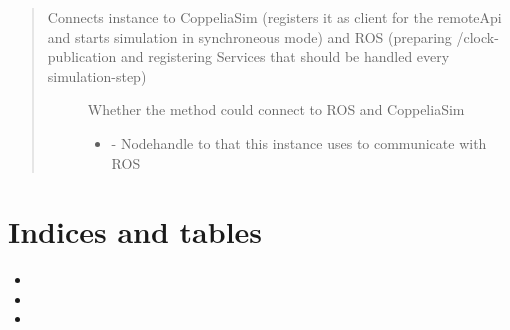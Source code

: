 \documentclass[letterpaper,10pt,english]{sphinxmanual}
\begin{document}
\begin{quote}
\begin{fulllineitems}
\begin{fulllineitems}
\end{fulllineitems}


\begin{fulllineitems}
\label{\detokenize{SimulationSynchronizer:_CPPv2N21coppeliasim_interface22SimulationSynchronizer4initERN3ros10NodeHandleE}}%
\pysigstartmultiline
{}\label{\detokenize{SimulationSynchronizer:project0classcoppeliasim__interface_1_1SimulationSynchronizer_1a86f3212df7425b946c6148ab324fd2bc}}%
\pysigstopmultiline
Connects instance to CoppeliaSim (registers it as client for the remoteApi and starts simulation in synchroneous mode) and ROS (preparing /clock-publication and registering Services that should be handled every simulation-step) 

\begin{description}
\item[{}] \leavevmode

Whether the method could connect to ROS and CoppeliaSim 


\item[{}] \leavevmode\begin{itemize}
\item {}  - 
Nodehandle to that this instance uses to communicate with ROS

\end{itemize}

\end{description}


\end{fulllineitems}


\end{fulllineitems}

\end{quote}


\chapter{Indices and tables}
\label{\detokenize{index:indices-and-tables}}\begin{itemize}
\item {} 

\item {} 

\item {} 

\end{itemize}



\renewcommand{\indexname}{Index}
\printindex
\end{document}

